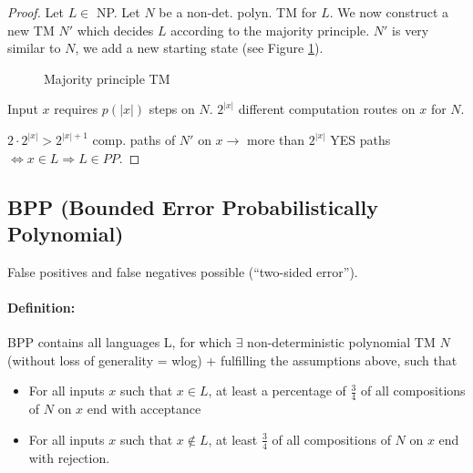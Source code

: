 \documentclass[11pt]{article}
\theoremstyle{definition}
\theoremstyle{definition}
\begin{document}
\begin{proof} Let $ L \in $ NP. Let $ N $ be a non-det. polyn. TM for $ L $. We now construct a new TM $ N' $ which decides $ L $ according to the majority principle. $ N' $ is very similar to $ N $, we add a new starting state (see Figure \ref{fig:tm}).


\begin{figure}
\centering

 \bigskip

\caption{Majority principle TM}
\label{fig:tm}
\end{figure}

Input $ x $ requires $ p(|x|) $ steps on $ N $. $ 2^{|x|} $ different computation routes on $ x $ for $ N $.

$ 2 \cdot 2^{|x|} > 2^{|x| + 1} $ comp. paths of $ N' $ on $ x \rightarrow $ more than $ 2^{|x|} $ YES paths $ \Leftrightarrow x \in L \Rightarrow L \in PP $.

\end{proof}

\subsection{BPP (Bounded Error Probabilistically Polynomial)}

False positives and false negatives possible (``two-sided error'').

\paragraph{Definition: } BPP contains all languages L, for which $ \exists $ non-deterministic polynomial TM $ N $ (without loss of generality = wlog) + fulfilling the assumptions above, such that
\begin{itemize}
\item For all inputs $ x $ such that $ x \in L $, at least a percentage of $ \frac{3}{4} $ of all compositions of $ N $ on $ x $ end with acceptance
\item For all inputs $ x $ such that $ x \not \in L $, at least $ \frac{3}{4} $ of all compositions of $ N $ on $ x $ end with rejection.
\end{itemize}
\end{document}
